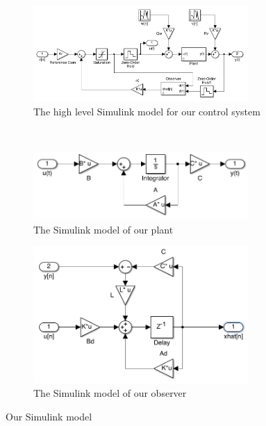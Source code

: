 \documentclass[11pt]{article}
\begin{document}
\begin{figure}[h]
\centering
    \begin{subfigure}[b]{0.8\textwidth}
        \includegraphics[width=0.9\textwidth]{system}
        \caption{The high level Simulink model for our control system}
        \label{fig:system}
    \end{subfigure}
    \\
    \begin{subfigure}[b]{0.4\textwidth}
        \includegraphics[width=0.9\textwidth]{plant}
        \caption{The Simulink model of our plant}
        \label{fig:plant}
    \end{subfigure}
    \begin{subfigure}[b]{0.4\textwidth}
        \includegraphics[width=0.9\textwidth]{observer}
        \caption{The Simulink model of our observer}
        \label{fig:observer}
    \end{subfigure}
    \caption{Our Simulink model}\label{fig:simulink}
\end{figure}
\end{document}
